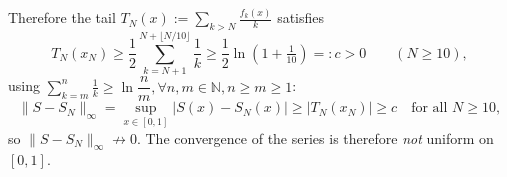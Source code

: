 \documentclass[dvipsnames,12pt]{exam}
\newcommand{\N}{{\mathbb{N}}}
\theoremstyle{definition}
\begin{document}
\begin{enumerate}[a)]
\begin{enumerate}[label=(\roman*)]
\medskip
Therefore the tail \(T_N(x):=\sum_{k>N}\frac{f_k(x)}{k}\) satisfies
\[ T_N(x_N) \ge \frac12 \sum_{k=N+1}^{N+\lfloor N/10\rfloor}\frac1k \ge \frac12\ln\left(1+\tfrac1{10}\right) =:c>0 \qquad(N\ge10), \]
using $\sum_{k=m}^n \tfrac1k \ge \ln\dfrac{n}{m}, \forall n,m\in\N,n\ge m\ge 1$:
\[ \|S-S_N\|_{\infty} =\sup_{x\in[0,1]}|S(x)-S_N(x)| \ge |T_N(x_N)| \ge c \quad\text{for all }N\ge10, \]
so \(\|S-S_N\|_{\infty}\not\to0\).  
The convergence of the series is therefore \emph{not} uniform on \([0,1]\).
\end{enumerate}
\end{enumerate}
\end{document}
